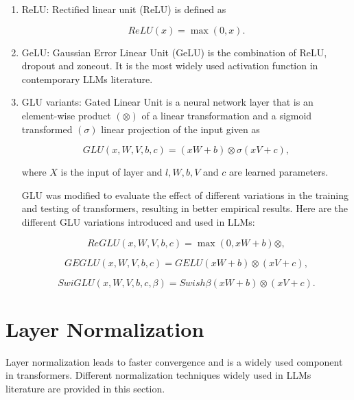 \documentclass[a4paper,oneside]{book}
\begin{document}
\begin{enumerate}
    \item ReLU: Rectified linear unit (ReLU) is defined as

          \begin{equation}
              ReLU(x)=\max(0, x).
          \end{equation}

    \item GeLU: Gaussian Error Linear Unit (GeLU) is the combination of ReLU, dropout and zoneout. It is the most widely used activation function in contemporary LLMs literature.

    \item GLU variants: Gated Linear Unit is a neural network layer that is an element-wise product $(\otimes)$ of a linear transformation and a sigmoid transformed $(\sigma)$ linear projection of the input given as

          \begin{equation}
              GLU(x, W, V, b, c)=(xW + b) \otimes \sigma(xV + c),
          \end{equation}

          where $X$ is the input of layer and $l, W, b, V$ and $c$ are learned parameters.

          GLU was modified to evaluate the effect of different variations in the training and testing of transformers, resulting in better empirical results. Here are the different GLU variations introduced and used in LLMs:

          \begin{equation}
              ReGLU(x, W, V, b, c) = \max (0, xW + b) \otimes,
          \end{equation}

          \begin{equation}
              GEGLU(x, W, V, b, c) = GELU(xW + b) \otimes(xV + c),
          \end{equation}

          \begin{equation}
              SwiGLU(x, W, V, b, c, \beta) = Swish \beta(xW + b) \otimes(xV + c).
          \end{equation}
\end{enumerate}

\section{Layer Normalization}
Layer normalization leads to faster convergence and is a widely used component in transformers. Different normalization techniques widely used in LLMs literature are provided in this section.
\end{document}
